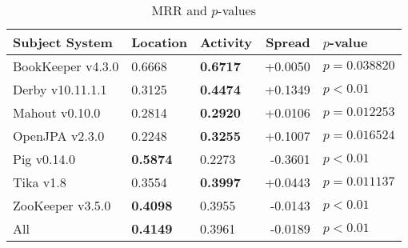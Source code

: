 \begin{table}[t]
\renewcommand{\arraystretch}{1.3}
\footnotesize
\centering
\caption{MRR and $p$-values}
\begin{tabular}{l|llr|l}
\toprule
Subject System & Location & Activity & Spread & $p$-value  \\
\midrule
BookKeeper v4.3.0 & 0.6668 & {\bf 0.6717 } & +0.0050 & $p = 0.038820$ \\
Derby v10.11.1.1 & 0.3125 & {\bf 0.4474 } & +0.1349 & $p < 0.01$ \\
Mahout v0.10.0 & 0.2814 & {\bf 0.2920 } & +0.0106 & $p = 0.012253$ \\
OpenJPA v2.3.0 & 0.2248 & {\bf 0.3255 } & +0.1007 & $p = 0.016524$ \\
Pig v0.14.0 & {\bf 0.5874 } & 0.2273 & -0.3601 & $p < 0.01$ \\
Tika v1.8 & 0.3554 & {\bf 0.3997 } & +0.0443 & $p = 0.011137$ \\
ZooKeeper v3.5.0 & {\bf 0.4098 } & 0.3955 & -0.0143 & $p < 0.01$ \\
\midrule
All & {\bf 0.4149 } & 0.3961 & -0.0189 & $p < 0.01$ \\
\bottomrule
\end{tabular}
\label{table:rq1:file:lda}
\end{table}
